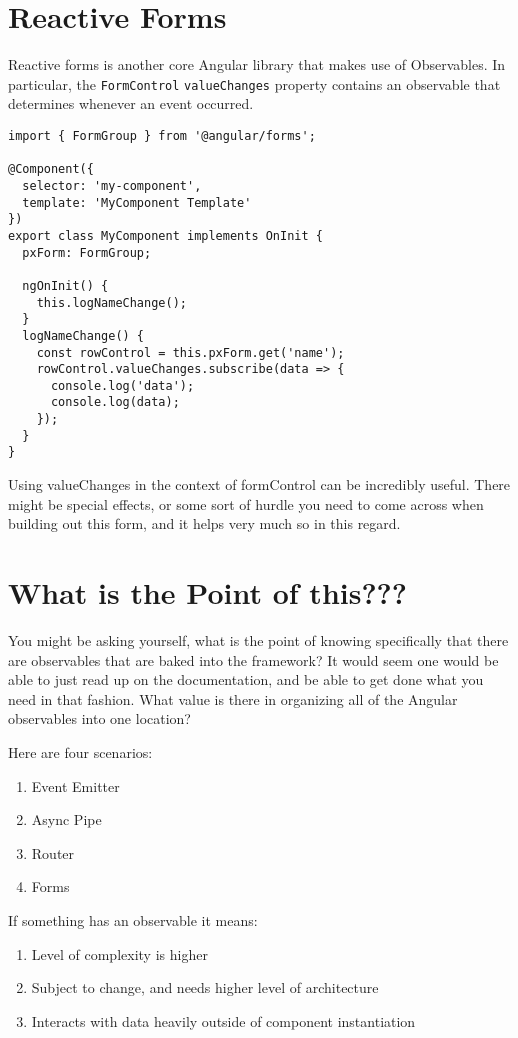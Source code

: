 \section{ Reactive Forms }
Reactive forms is another core Angular library that makes use of Observables. In particular, the \lstinline{FormControl} \lstinline{valueChanges} property contains an observable that determines whenever an event occurred. 
\begin{lstlisting}
import { FormGroup } from '@angular/forms';

@Component({
  selector: 'my-component',
  template: 'MyComponent Template'
})
export class MyComponent implements OnInit {
  pxForm: FormGroup;

  ngOnInit() {
    this.logNameChange();
  }
  logNameChange() {
    const rowControl = this.pxForm.get('name');
    rowControl.valueChanges.subscribe(data => {
      console.log('data');
      console.log(data);
    });
  }
}  
\end{lstlisting}

Using valueChanges in the context of formControl can be incredibly useful. There might be special effects, or some sort of hurdle you need to come across when building out this form, and it helps very much so in this regard. 


\section{What is the Point of this??? }
You might be asking yourself, what is the point of knowing specifically that there are observables that are baked into the framework? It would seem one would be able to just read up on the documentation, and be able to get done what you need in that fashion. What value is there in organizing all of the Angular observables into one location? 

Here are four scenarios:
\begin{enumerate}
  \item Event Emitter
  \item Async Pipe
  \item Router
  \item Forms
\end{enumerate}
 
If something has an observable it means: 
\begin{enumerate}
  \item Level of complexity is higher 
  \item Subject to change, and needs higher level of architecture
  \item Interacts with data heavily outside of component instantiation
\end{enumerate}
